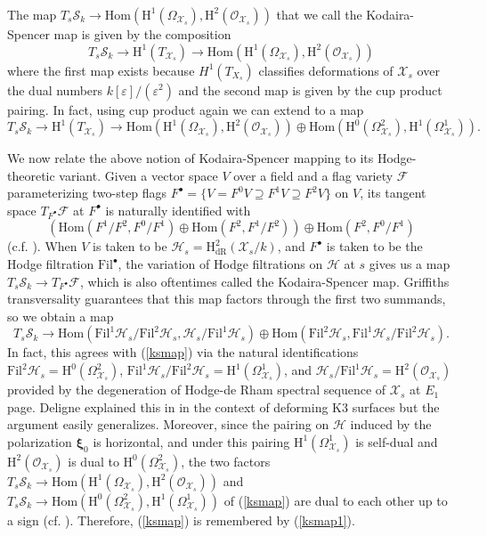 \documentclass[letter, 11pt]{article}
\theoremstyle{plain}
\theoremstyle{definition}
\newcommand{\Hom}{\mathrm{Hom}}
\newcommand{\<}{\langle}
\renewcommand{\>}{\rangle}
\newcommand{\sF}{\mathcal{F}}
\newcommand{\sH}{\mathcal{H}}
\newcommand{\sX}{\mathcal{X}}
\newcommand{\sS}{\mathcal{S}}
\newcommand{\sO}{\mathcal{O}}
\newcommand{\Fil}{\mathrm{Fil}}
\renewcommand{\H}{\mathrm{H}}
\newcommand{\dR}{\mathrm{dR}}
\newcommand{\bxi}{\boldsymbol{\xi}}
\begin{document}
\subsubsection{} The map $T_s \sS_{k} \to \Hom(\H^1(\Omega_{\sX_s}), \H^2(\sO_{\sX_s}))$ that we call the Kodaira-Spencer map is given by the composition
\begin{equation}
\label{ksmap1}
T_s \sS_{k} \to \H^1(T_{\sX_s}) \to \Hom(\H^1(\Omega_{\sX_s}), \H^2(\sO_{\sX_s}))
\end{equation} 
where the first map exists because $H^1(T_{X_s})$ classifies deformations of $\sX_s$ over the dual numbers $k[\varepsilon]/(\varepsilon^2)$ and the second map is given by the cup product pairing. In fact, using cup product again we can extend to a map 
\begin{equation}
\label{ksmap}
T_s \sS_{k} \to \H^1(T_{\sX_s}) \to \Hom(\H^1(\Omega_{\sX_s}), \H^2(\sO_{\sX_s})) \oplus \Hom(\H^0(\Omega_{\sX_s}^2), \H^1(\Omega^1_{\sX_s})).
\end{equation} 

We now relate the above notion of Kodaira-Spencer mapping to its Hodge-theoretic variant. Given a vector space $V$ over a field and a flag variety $\sF$ parameterizing two-step flags $F^{\bullet} = \{ V = F^0 V \supseteq F^1 V \supseteq F^2 V \}$ on $V$, its tangent space $T_{F^\bullet} \sF$ at $F^\bullet$ is naturally identified with 
\[ (\Hom(F^1 / F^2, F^0/F^1) \oplus \Hom(F^2, F^1/F^2)) \oplus \Hom(F^2, F^0/F^1) \]
(c.f. \cite[Chap II]{zbMATH06031035}). When $V$ is taken to be $\sH_s = \H^2_\dR(\sX_s/k)$, and $F^\bullet$ is taken to be the Hodge filtration $\Fil^\bullet$, the variation of Hodge filtrations on $\sH$ at $s$ gives us a map $T_s \sS_{k} \to T_{F^\bullet} \sF$, which is also oftentimes called the Kodaira-Spencer map. Griffiths transversality guarantees that this map factors through the first two summands, so we obtain a map 
\begin{equation}
\label{grifftransversedecomp}
T_s \sS_{k} \to \Hom(\Fil^1 \sH_s / \Fil^2 \sH_s, \sH_s / \Fil^1 \sH_s) \oplus \Hom(\Fil^2 \sH_s, \Fil^1 \sH_s / \Fil^2 \sH_s).
\end{equation}
In fact, this agrees with (\ref{ksmap}) via the natural identifications $\Fil^2 \sH_s = \H^0(\Omega^2_{\sX_s})$, $\Fil^1 \sH_s / \Fil^2 \sH_s = \H^1(\Omega^1_{\sX_s})$, and $\sH_s / \Fil^1 \sH_s = \H^2(\sO_{\sX_s})$ provided by the degeneration of Hodge-de Rham spectral sequence of $\sX_s$ at $E_1$ page. Deligne explained this in \cite[(2.3.12)]{Del02} in the context of deforming K3 surfaces but the argument easily generalizes. Moreover, since the pairing on $\sH$ induced by the polarization $\bxi_0$ is horizontal, and under this pairing $\H^1(\Omega_{\sX_s}^1)$ is self-dual and $\H^2(\sO_{\sX_s})$ is dual to $\H^0(\Omega_{\sX_s}^2)$, the two factors $T_s \sS_{k} \to \Hom(\H^1(\Omega_{\sX_s}), \H^2(\sO_{\sX_s}))$ and $T_s \sS_{k} \to \Hom(\H^0(\Omega_{\sX_s}^2), \H^1(\Omega^1_{\sX_s}))$ of (\ref{ksmap}) are dual to each other up to a sign (cf. \cite[(2.3.14)]{Del02}). Therefore, (\ref{ksmap}) is remembered by (\ref{ksmap1}). 
\end{document}
